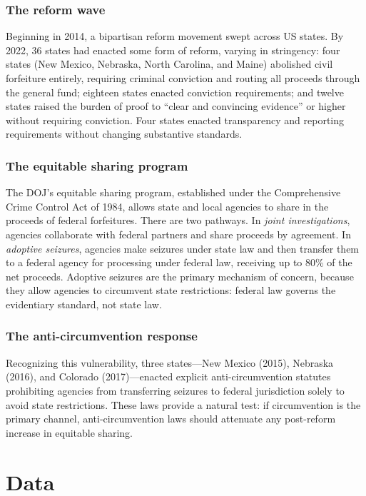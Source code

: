 \documentclass[12pt]{article}
\begin{document}
\subsubsection*{The reform wave} Beginning in 2014, a bipartisan reform movement swept across US states. By 2022, 36 states had enacted some form of reform, varying in stringency: four states (New Mexico, Nebraska, North Carolina, and Maine) abolished civil forfeiture entirely, requiring criminal conviction and routing all proceeds through the general fund; eighteen states enacted conviction requirements; and twelve states raised the burden of proof to ``clear and convincing evidence'' or higher without requiring conviction. Four states enacted transparency and reporting requirements without changing substantive standards.

\subsubsection*{The equitable sharing program} The DOJ's equitable sharing program, established under the Comprehensive Crime Control Act of 1984, allows state and local agencies to share in the proceeds of federal forfeitures. There are two pathways. In \emph{joint investigations}, agencies collaborate with federal partners and share proceeds by agreement. In \emph{adoptive seizures}, agencies make seizures under state law and then transfer them to a federal agency for processing under federal law, receiving up to 80\% of the net proceeds. Adoptive seizures are the primary mechanism of concern, because they allow agencies to circumvent state restrictions: federal law governs the evidentiary standard, not state law.

\subsubsection*{The anti-circumvention response} Recognizing this vulnerability, three states---New Mexico (2015), Nebraska (2016), and Colorado (2017)---enacted explicit anti-circumvention statutes prohibiting agencies from transferring seizures to federal jurisdiction solely to avoid state restrictions. These laws provide a natural test: if circumvention is the primary channel, anti-circumvention laws should attenuate any post-reform increase in equitable sharing.

\section{Data}\label{sec:data}
\end{document}
